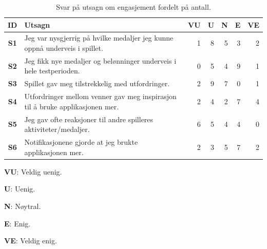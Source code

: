   \begin{table}[H]     
    \small
    \begin{threeparttable}[t]
    \begin{tabularx}{\textwidth}{|>{\bfseries}c|X|r|r|r|r|r|}
        \hline  \textbf{ID} &  \textbf{Utsagn} & \textbf{VU }  &  \textbf{U}  &  \textbf{N}  &  \textbf{E}  &  \textbf{VE}  \\ \hline
        S1 & Jeg var nysgjerrig på hvilke medaljer jeg kunne oppnå underveis i spillet.  & 1 & 8 & 5 & 3 & 2 \\ 
        S2 & Jeg fikk nye medaljer og belønninger underveis i hele testperioden.  & 0 & 5 & 4 & 9 & 1 \\ 
        S3 & Spillet gav meg tilstrekkelig med utfordringer.  & 2 & 9 & 7 & 0 & 1 \\ 
        S4 & Utfordringer mellom venner gav meg inspirasjon til å bruke applikasjonen mer.  & 2 & 4 & 2 & 7 & 4 \\ 
        S5 & Jeg gav ofte reaksjoner til andre spilleres aktiviteter/medaljer.  & 6 & 5 & 4 & 4 & 0 \\ 
        S6 & Notifikasjonene gjorde at jeg brukte applikasjonen mer.  & 2 & 3 & 5 & 7 & 2 \\
         \hline
    \end{tabularx}
    
    \begin{tablenotes}
    \scriptsize
     \item[] \textbf{VU}: Veldig uenig.
     \item[] \textbf{U}: Uenig.
     \item[] \textbf{N}: Nøytral.
     \item[] \textbf{E}: Enig.
     \item[] \textbf{VE}: Veldig enig.
   \end{tablenotes}
   \end{threeparttable}
    \caption{Svar på utsagn om engasjement fordelt på antall.}
\end{table}

